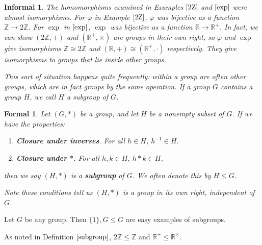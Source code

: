\documentclass{amsart}
\newtheorem*{formal}{Formal}
\newtheorem*{informal}{Informal}
\begin{document}
\begin{definition}\label{subgroup}
	\begin{informal}
		The homomorphisms examined in Examples \(\ref{2Z}\) and \(\ref{exp}\) were
		almost isomorphisms. For \(\varphi\) in Example \(\ref{2Z}\), \(\varphi\)
		was bijective as a function \(\mathbb{Z}\to2\mathbb{Z}\). For \(\exp\) in
		\(\ref{exp}\), \(\exp\) was bijective as a function
		\(\mathbb{R}\to\mathbb{R}^+\). In fact, we can show \((2\mathbb{Z}, +)\)
		and \((\mathbb{R}^+, \times)\) are groups in their own right, so
		\(\varphi\) and \(\exp\) give isomorphisms \(\mathbb{Z}\cong2\mathbb{Z}\)
		and \((\mathbb{R}, +)\cong(\mathbb{R}^+, \cdot)\) respectively. They give
		isomorphisms to groups that lie inside other groups.

		This sort of situation happens quite frequently: within a group are often
		other groups, which are in fact groups by the same operation. If a group
		\(G\) contains a group \(H\), we call \(H\) a \emph{subgroup} of \(G\).
	\end{informal}

	\begin{formal}
	   Let \((G, \ast)\) be a group, and let \(H\) be a nonempty subset of
		\(G\). If we have the properties: 
		\begin{enumerate}[label=(\roman*)]
			\item \textbf{Closure under inverses}. For all \(h\in H\), \(h^{-1}\in
			H\).
			\item \textbf{Closure under \(\ast\)}. For all \(h, k\in H\), \(h\ast
			k\in H\),
		\end{enumerate}
		then we say	\((H, \ast)\) is a \textbf{subgroup} of \(G\). We often
		denote this by	\(H\le G\).

		Note these conditions tell us \((H, \ast)\) is a group in its own right,
		independent of \(G\).
	\end{formal}
\end{definition}

\begin{example}\label{easy-subgroups}
   Let \(G\) be any group. Then \(\{1\}, G\le G\) are easy examples of
	subgroups.
\end{example}

\begin{example}
	As noted in Definition \(\ref{subgroup}\), \(2\mathbb{Z}\le \mathbb{Z}\) and
	\(\mathbb{R}^+\le\mathbb{R}^\times\).
\end{example}
\end{document}
